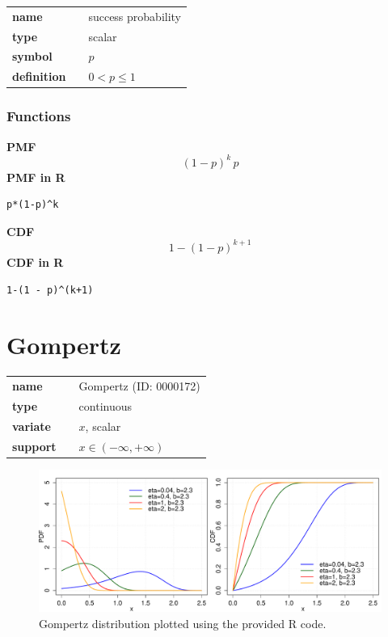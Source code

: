 \documentclass{article}
\begin{document}
\noindent\begin{tabular}{p{2cm}cl}
\textbf{name} & & success probability \\
\textbf{type} & & scalar \\
\textbf{symbol} & & $p$  \\
\textbf{definition} & & $0< p \leq 1$
\end{tabular}
\subsubsection*{Functions}

\smallskip \noindent \hspace{.2cm} \textbf{PMF} 
\begin{equation*}(1 - p)^k\,p\end{equation*}
\smallskip \noindent \hspace{.2cm} \textbf{PMF in R}  
\begin{verbatim}p*(1-p)^k\end{verbatim}
\smallskip \noindent \hspace{.2cm} \textbf{CDF} 
\begin{equation*}1-(1 - p)^{k+1}\end{equation*}
\smallskip \noindent \hspace{.2cm} \textbf{CDF in R} 
\begin{verbatim}1-(1 - p)^(k+1)\end{verbatim}
\smallskip\section*{Gompertz} 

  \bigskip 

\begin{tabular}{p{2cm}cl}
\textbf{name} & & Gompertz (ID: 0000172)\\ 
 
\textbf{type} & & continuous \\ 

\textbf{variate} & & $x$, scalar \\ 

\textbf{support} & & $x \in (-\infty,+\infty)$
\end{tabular}

\begin{figure}[ht!]
\centering
  \includegraphics[width=140mm]{pics/Gompertz.pdf}
 \caption{Gompertz distribution plotted using the provided R code.}
 \label{fig:Gompertz}
\end{figure}
\end{document}
